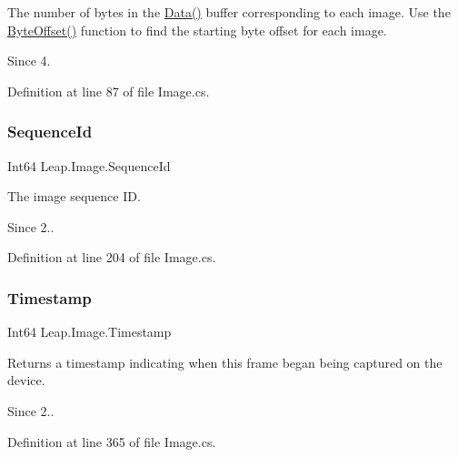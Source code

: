 The number of bytes in the \mbox{\hyperlink{class_leap_1_1_image_a13a2744f47a3bb324d08dca19d971f17}{Data()}} buffer corresponding to each image. Use the \mbox{\hyperlink{class_leap_1_1_image_aaab2f799bc4f2f315c26d14401b8a7e7}{Byte\+Offset()}} function to find the starting byte offset for each image. 

\begin{DoxySince}{Since}
4. 
\end{DoxySince}


Definition at line 87 of file Image.\+cs.

\mbox{\label{class_leap_1_1_image_aa9411917ca37f9f0b6d2f2c0e7b37d81}} 
\subsubsection{\texorpdfstring{SequenceId}{SequenceId}}
{\footnotesize\ttfamily Int64 Leap.\+Image.\+Sequence\+Id\hspace{0.3cm}{\ttfamily [get]}}



The image sequence ID. 

\begin{DoxySince}{Since}
2.. 
\end{DoxySince}


Definition at line 204 of file Image.\+cs.

\mbox{\label{class_leap_1_1_image_a984396ef2f504442b8d84a54430417c8}} 
\subsubsection{\texorpdfstring{Timestamp}{Timestamp}}
{\footnotesize\ttfamily Int64 Leap.\+Image.\+Timestamp\hspace{0.3cm}{\ttfamily [get]}}



Returns a timestamp indicating when this frame began being captured on the device. 

\begin{DoxySince}{Since}
2.. 
\end{DoxySince}


Definition at line 365 of file Image.\+cs.

